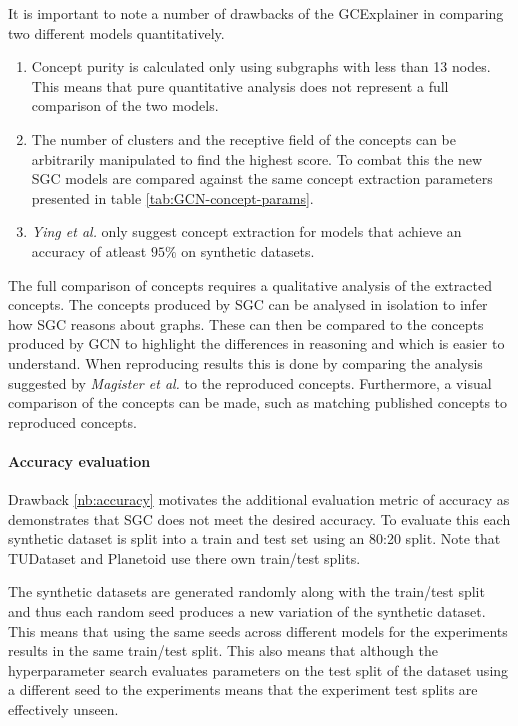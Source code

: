 It is important to note a number of drawbacks of the GCExplainer in comparing two different models quantitatively.
\begin{enumerate}
    \item 
        Concept purity is calculated only using subgraphs with less than 13 nodes.
        This means that pure quantitative analysis does not represent a full comparison of the two models.
    \item 
        The number of clusters and the receptive field of the concepts can be arbitrarily manipulated to find the highest score.
        To combat this the new SGC models are compared against the same concept extraction parameters presented in table \ref{tab:GCN-concept-params}.
    \item 
        \label{nb:accuracy}
        \textit{Ying et al.}\cite{ying2019gnnexplainer} only suggest concept extraction for models that achieve an accuracy of atleast $95\%$ on synthetic datasets. 
\end{enumerate}

The full comparison of concepts requires a qualitative analysis of the extracted concepts.
The concepts produced by SGC can be analysed in isolation to infer how SGC reasons about graphs.
These can then be compared to the concepts produced by GCN to highlight the differences in reasoning and which is easier to understand.
When reproducing results this is done by comparing the analysis suggested by \textit{Magister et al.}\cite{magister2021gcexplainer} to the reproduced concepts.
Furthermore, a visual comparison of the concepts can be made, such as matching published concepts to reproduced concepts.

\paragraph{Accuracy evaluation}
Drawback \ref{nb:accuracy} motivates the additional evaluation metric of accuracy as  demonstrates that SGC does not meet the desired accuracy.
To evaluate this each synthetic dataset is split into a train and test set using an 80:20 split.
Note that TUDataset\cite{Morris+2020} and Planetoid\cite{kipf2016semi} use there own train/test splits.

The synthetic datasets are generated randomly along with the train/test split and thus each random seed produces a new variation of the synthetic dataset.
This means that using the same seeds across different models for the experiments results in the same train/test split.
This also means that although the hyperparameter search evaluates parameters on the test split of the dataset using a different seed to the experiments means that the experiment test splits are effectively unseen.

